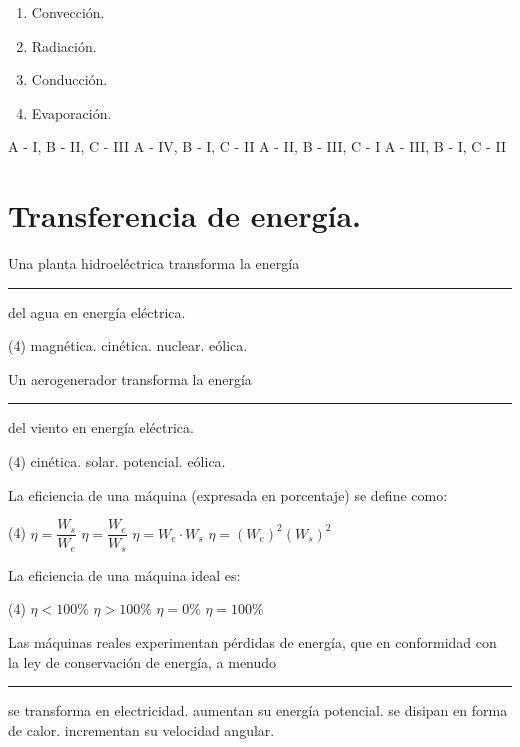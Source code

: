 \documentclass[12pt, letter]{exam}
\begin{document}
\begin{questions}
\begin{figure}[H]
    \end{figure}
    \begin{multicols}{4}
    \begin{enumerate}[label=\Roman*)]
        \item Convección.
        \item Radiación.
        \item Conducción.
        \item Evaporación.
    \end{enumerate}
    \end{multicols}
    \begin{tasks}
        \task A - I, B - II, C - III
        \task A - IV, B - I, C - II
        \task A - II, B - III, C - I
        \task A - III, B - I, C - II
    \end{tasks}

    \section{Transferencia de energía.}

    \question Una planta hidroeléctrica transforma la energía \rule{2cm}{0.1mm} del agua en energía eléctrica.
    \begin{tasks}(4)
        \task magnética.
        \task cinética.
        \task nuclear.
        \task eólica.
    \end{tasks}
    \question Un aerogenerador transforma la energía \rule{2cm}{0.1mm} del viento en energía eléctrica.
    \begin{tasks}(4)
        \task cinética.
        \task solar.
        \task potencial.
        \task eólica.
    \end{tasks}
    \question La eficiencia de una máquina (expresada en porcentaje) se define como:
    \begin{tasks}(4)
        \task $\eta = \dfrac{W_{s}}{W_{e}}$
        \task $\eta = \dfrac{W_{e}}{W_{s}}$
        \task $\eta = W_{e} \cdot W_{s}$
        \task $\eta = (W_{e})^2 (W_{s})^2$
    \end{tasks}
    \question La eficiencia de una máquina ideal es:
    \begin{tasks}(4)
        \task $\eta < 100 \%$
        \task $\eta > 100 \%$
        \task $\eta = 0 \%$
        \task $\eta = 100 \%$
    \end{tasks}
    \question Las máquinas reales experimentan pérdidas de energía, que en conformidad con la ley de conservación de energía, a menudo \rule{2cm}{0.1mm}
    \begin{tasks}
        \task se transforma en electricidad.
        \task aumentan su energía potencial.
        \task se disipan en forma de calor.
        \task incrementan su velocidad angular.
    \end{tasks}

\end{questions}
\end{document}
